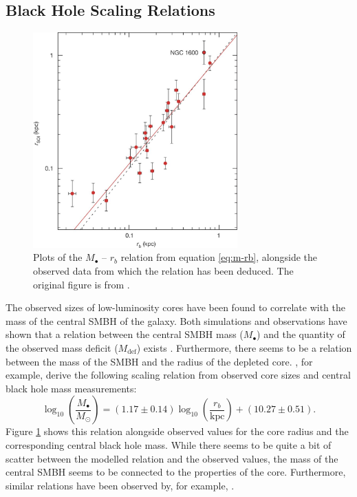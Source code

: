 \documentclass[english, twoside]{HYgradu}
\begin{document}
\subsection{Black Hole Scaling Relations} \label{section:scaling_relation}

\begin{figure}
	\centering
	\includegraphics[width=0.7\textwidth]{thomas_mbh-rb.png}
	\caption{Plots of the $M_\bullet$ – $r_b$ relation from equation \ref{eq:m-rb}, alongside the observed data from which the relation has been deduced. The original figure is from \cite{Thomas2016}.}
	\label{figure:m-rb}
\end{figure}

The observed sizes of low-luminosity cores have been found to correlate with the mass of the central SMBH of the galaxy. Both simulations and observations have shown that a relation between the central SMBH mass ($M_\bullet$) and the quantity of the observed mass deficit ($M_\mathrm{def}$) exists \citep{Graham2004, Merritt2006, Dullo2014}. Furthermore, there seems to be a relation between the mass of the SMBH and the radius of the depleted core. \cite{Thomas2016}, for example, derive the following scaling relation from observed core sizes and central black hole mass measurements:
\begin{equation}
\log_{10} \left( \frac{M_\bullet}{M_\odot} \right) = (1.17 \pm 0.14) \log_{10} \left( \frac{r_b}{\mathrm{kpc}} \right) + (10.27 \pm 0.51). \label{eq:m-rb}
\end{equation}
Figure \ref{figure:m-rb} shows this relation alongside observed values for the core radius and the corresponding central black hole mass. While there seems to be quite a bit of scatter between the modelled relation and the observed values, the mass of the central SMBH seems to be connected to the properties of the core. Furthermore, similar relations have been observed by, for example, \cite{Dullo2012}.
\end{document}

